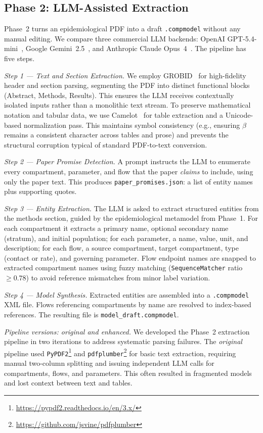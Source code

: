 \subsection{Phase 2: LLM-Assisted Extraction}
\label{sec:phase2}

Phase~2 turns an epidemiological PDF into a draft \texttt{.compmodel} without any manual
editing. We compare three commercial LLM backends: OpenAI GPT-5.4-mini~\cite{achiam2023gpt4},
Google Gemini~2.5~\cite{team2024gemini}, and Anthropic Claude Opus~4~\cite{anthropic2024claude}.
The pipeline has five steps.

\textit{Step 1 --- Text and Section Extraction.}
We employ GROBID~\cite{romary2015grobid} for high-fidelity header and section parsing, segmenting the PDF into distinct functional blocks (Abstract, Methods, Results). This ensures the LLM receives contextually isolated inputs rather than a monolithic text stream. To preserve mathematical notation and tabular data, we use Camelot~\cite{camelot2019} for table extraction and a Unicode-based normalization pass. This maintains symbol consistency (e.g., ensuring $\beta$ remains a consistent character across tables and prose) and prevents the structural corruption typical of standard PDF-to-text conversion.

\textit{Step 2 --- Paper Promise Detection.}
A prompt instructs the LLM to enumerate every compartment, parameter, and flow that the
paper \emph{claims} to include, using only the paper text. This produces
\texttt{paper\_promises.json}: a list of entity names plus supporting quotes.

\textit{Step 3 --- Entity Extraction.}
The LLM is asked to extract structured entities from the methods section, guided by the
epidemiological metamodel from Phase~1. For each compartment it extracts a primary name,
optional secondary name (stratum), and initial population; for each parameter, a name,
value, unit, and description; for each flow, a source compartment, target compartment,
type (contact or rate), and governing parameter. Flow endpoint names are snapped to
extracted compartment names using fuzzy matching (\texttt{SequenceMatcher} ratio
$\geq 0.78$) to avoid reference mismatches from minor label variation.

\textit{Step 4 --- Model Synthesis.}
Extracted entities are assembled into a \texttt{.compmodel} XML file. Flows referencing
compartments by name are resolved to index-based references. The resulting file is
\texttt{model\_draft.compmodel}.

\textit{Pipeline versions: original and enhanced.}
\label{sec:phase2versions}
We developed the Phase~2 extraction pipeline in two iterations to address systematic parsing failures. The \emph{original} pipeline used \texttt{PyPDF2}\footnote{\url{https://pypdf2.readthedocs.io/en/3.x/}} and \texttt{pdfplumber}\footnote{\url{https://github.com/jsvine/pdfplumber}} for basic text extraction, requiring manual two-column splitting and issuing independent LLM calls for compartments, flows, and parameters. This often resulted in fragmented models and lost context between text and tables. 

